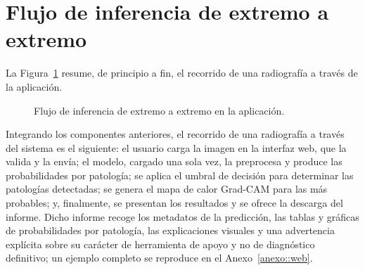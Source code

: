 \section{Flujo de inferencia de extremo a extremo}
\label{sec::dep_flujo}

La Figura~\ref{fig::dep_flujo_inferencia} resume, de principio a fin, el recorrido de
una radiografía a través de la aplicación.

\begin{figure}[ht]
\centering
{}
\caption{Flujo de inferencia de extremo a extremo en la aplicación.}
\label{fig::dep_flujo_inferencia}
\end{figure}

Integrando los componentes anteriores, el recorrido de una radiografía a través del
sistema es el siguiente: el usuario carga la imagen en la interfaz web, que la
valida y la envía; el modelo, cargado una sola vez, la preprocesa y produce las
probabilidades por patología; se aplica el umbral de decisión para determinar las
patologías detectadas; se genera el mapa de calor Grad-CAM para las más probables;
y, finalmente, se presentan los resultados y se ofrece la descarga del informe. Dicho
informe recoge los metadatos de la predicción, las tablas y gráficas de probabilidades
por patología, las explicaciones visuales y una advertencia explícita sobre su carácter
de herramienta de apoyo y no de diagnóstico definitivo; un ejemplo completo se reproduce
en el Anexo~\ref{anexo::web}.
